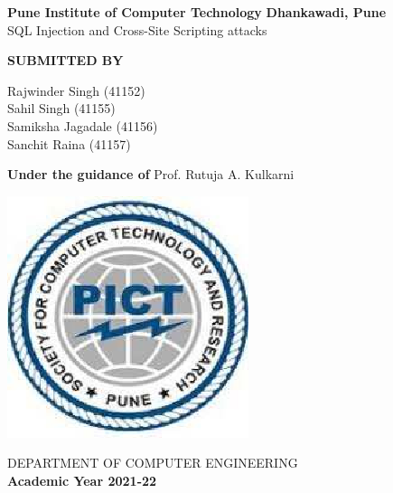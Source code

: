 \documentclass[a4paper, 12pt, fleqn]{article}
\begin{document}
 
\begin{titlepage}
    \begin{center}
        \vspace*{1cm}
        \par
        \large
                \textbf{Pune Institute of Computer Technology}	
                \linebreak
		\textbf{Dhankawadi, Pune}
        \vspace{0.5cm}
        \linebreak
        \vspace{0.5cm}
        \large
        \\SQL Injection and Cross-Site Scripting attacks
        \linebreak
        \linebreak
		
		\textbf{SUBMITTED BY}
		\vspace{1cm}
		
         Rajwinder Singh (41152) \\
         Sahil Singh (41155) \\
         Samiksha Jagadale (41156) \\
         Sanchit Raina (41157)
        \linebreak
        \linebreak
		        
        \textbf{\large{Under the guidance of}}
		\linebreak
	    Prof. Rutuja A. Kulkarni
		\linebreak
        
        
        
        \vspace{0.8cm}
        

        \includegraphics[scale=0.6]{pict}   
        
        \Large
        DEPARTMENT OF COMPUTER ENGINEERING\\
		\textbf{Academic Year 2021-22}
        
    \end{center}
\end{titlepage}
\pagebreak
\end{document}
